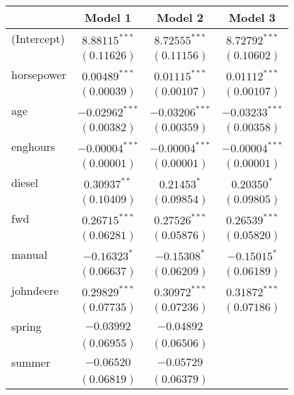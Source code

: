 
\begin{table}
\begin{center}
\begin{tabular}{l c c c}
\hline
 & Model 1 & Model 2 & Model 3 \\
\hline
(Intercept)         & $8.88115^{***}$  & $8.72555^{***}$  & $8.72792^{***}$  \\
                    & $(0.11626)$      & $(0.11156)$      & $(0.10602)$      \\
horsepower          & $0.00489^{***}$  & $0.01115^{***}$  & $0.01112^{***}$  \\
                    & $(0.00039)$      & $(0.00107)$      & $(0.00107)$      \\
age                 & $-0.02962^{***}$ & $-0.03206^{***}$ & $-0.03233^{***}$ \\
                    & $(0.00382)$      & $(0.00359)$      & $(0.00358)$      \\
enghours            & $-0.00004^{***}$ & $-0.00004^{***}$ & $-0.00004^{***}$ \\
                    & $(0.00001)$      & $(0.00001)$      & $(0.00001)$      \\
diesel              & $0.30937^{**}$   & $0.21453^{*}$    & $0.20350^{*}$    \\
                    & $(0.10409)$      & $(0.09854)$      & $(0.09805)$      \\
fwd                 & $0.26715^{***}$  & $0.27526^{***}$  & $0.26539^{***}$  \\
                    & $(0.06281)$      & $(0.05876)$      & $(0.05820)$      \\
manual              & $-0.16323^{*}$   & $-0.15308^{*}$   & $-0.15015^{*}$   \\
                    & $(0.06637)$      & $(0.06209)$      & $(0.06189)$      \\
johndeere           & $0.29829^{***}$  & $0.30972^{***}$  & $0.31872^{***}$  \\
                    & $(0.07735)$      & $(0.07236)$      & $(0.07186)$      \\
spring              & $-0.03992$       & $-0.04892$       &                  \\
                    & $(0.06955)$      & $(0.06506)$      &                  \\
summer              & $-0.06520$       & $-0.05729$       &                  \\
                    & $(0.06819)$      & $(0.06379)$      &                  \\

\end{tabular}
\end{center}
\end{table}

